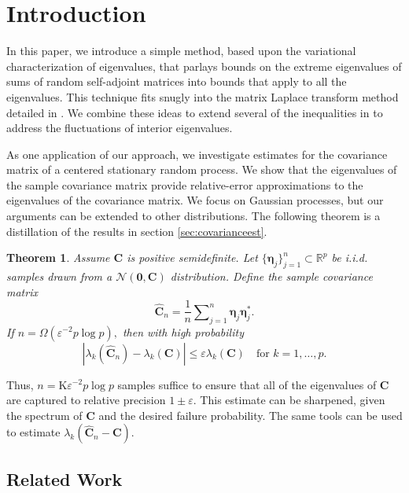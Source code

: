 \documentclass[11pt,letterpaper,twoside,reqno,nosumlimits]{amsart}
\renewcommand{\star}{*}
\newcommand{\mat}[1]{\ensuremath{\bm{#1}}} %
\renewcommand{\vec}[1]{\ensuremath{\bm{#1}}}
\newcommand{\R}{\ensuremath{\mathbb{R}}}
\newtheorem{thm}{Theorem}
\theoremstyle{remark}
\numberwithin{equation}{section}
\numberwithin{thm}{section}
\numberwithin{prop}{section}
\numberwithin{defn}{section}
\numberwithin{remark}{section}
\begin{document}
\maketitle

\section{Introduction}
In this paper, we introduce a simple method, based upon the variational characterization of eigenvalues, that parlays bounds on the extreme eigenvalues of sums of random self-adjoint matrices into bounds that apply to all the eigenvalues. This technique fits snugly into the matrix Laplace transform method detailed in \cite{T10a}. We combine these ideas to extend several of the inequalities in \cite{T10a} to address the fluctuations of interior eigenvalues. 

As one application of our approach, we investigate estimates for the covariance matrix of a centered stationary random process. We show that the eigenvalues of the sample covariance matrix provide relative-error approximations to the eigenvalues of the covariance matrix. We focus on Gaussian processes, but our arguments can be extended to other distributions. The following theorem is a distillation of the results in section \ref{sec:covarianceest}.
\begin{thm}
Assume $\mat{C}$ is positive semidefinite. Let $\{\vec{\eta}_j\}_{j=1}^n \subset \R^p$ be i.i.d. samples drawn from a $\mathcal{N}(\vec{0}, \mat{C})$ distribution. Define the sample covariance matrix
\[
\widehat{\mat{C}}_n = \frac{1}{n} \sum\nolimits_{j=1}^n \vec{\eta}_j\vec{\eta}_j^\star.
\]
If $n = \Omega(\varepsilon^{-2} p \log p),$ then with high probability
\[
|\lambda_k(\widehat{\mat{C}}_n) - \lambda_k(\mat{C})| \leq \varepsilon \lambda_k(\mat{C}) \quad \text{for } k=1, \ldots,p.
\]
\label{thm:examplecovarest}
\end{thm}
Thus, $n = \mathrm{K} \varepsilon^{-2} p \log p$ samples suffice to ensure that all of the eigenvalues of $\mat{C}$ are captured to relative precision $1 \pm \varepsilon.$ This estimate can be sharpened, given the spectrum of $\mat{C}$ and the desired failure probability. The same tools can be used to estimate $\lambda_k(\widehat{\mat{C}}_n - \mat{C}).$

\subsection{Related Work}
\end{document}
